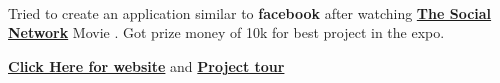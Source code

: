 \documentclass{deedy-resume-openfont}
\begin{document}
\begin{minipage}[t]{0.66\textwidth}
\\
\begin{tightemize}
\item Tried to create an application similar to \textbf{facebook} after watching \textbf{\href{https://www.imdb.com/title/tt1285016/}{The Social Network}} Movie {}. Got prize money of 10k for best project in the expo. 
\item \textbf{\href{http://vignanhub.phpnet.us/}{Click Here for website}} and \textbf{\href{https://www.youtube.com/watch?v=SD9KdLAw1OI}{Project tour}}
\end{tightemize}
\sectionsep
\nocite{*}

\end{minipage} 
\end{document}
